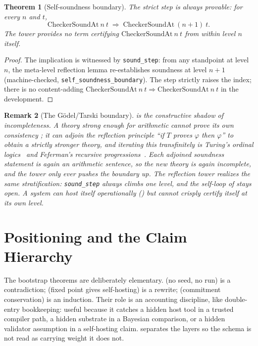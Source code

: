 \documentclass[11pt,a4paper]{article}
\newtheorem{theorem}{Theorem}[section]
\newtheorem{remark}[theorem]{Remark}
\begin{document}
\begin{theorem}[Self-soundness boundary]
\label{thm:self-boundary}
The strict step is always provable: for every $n$ and $t$,
\[
  \mathrm{CheckerSoundAt}\ n\ t \;\Rightarrow\;
  \mathrm{CheckerSoundAt}\ (n+1)\ t.
\]
The tower provides no term certifying $\mathrm{CheckerSoundAt}\ n\ t$ from
within level $n$ itself.
\end{theorem}

\begin{proof}
The implication is witnessed by \texttt{sound\_step}: from any standpoint at
level $n$, the meta-level reflection lemma re-establishes soundness at level
$n+1$
(machine-checked, \texttt{self\_soundness\_boundary}).
The step strictly raises the index; there is no content-adding
$\mathrm{CheckerSoundAt}\ n\ t \Rightarrow \mathrm{CheckerSoundAt}\ n\ t$ in
the development.
\end{proof}

\begin{remark}[The G\"odel/Tarski boundary]
\label{rem:godel}
 is the constructive shadow of incompleteness.
A theory strong enough for arithmetic cannot prove its own consistency
\cite{godel1931}; it can adjoin the reflection principle ``if $T$ proves
$\varphi$ then $\varphi$'' to obtain a strictly stronger theory, and iterating
this transfinitely is Turing's ordinal logics~\cite{turing1939} and Feferman's
recursive progressions~\cite{feferman1962}.
Each adjoined soundness statement is again an arithmetic sentence, so the new
theory is again incomplete, and the tower only ever pushes the boundary up.
The reflection tower realizes the same stratification: \texttt{sound\_step}
always climbs one level, and the self-loop of  stays open.
A system can host itself operationally () but cannot
crisply certify itself at its own level.
\end{remark}

\section{Positioning and the Claim Hierarchy}
\label{sec:positioning}

The bootstrap theorems are deliberately elementary.
 (no seed, no run) is a contradiction;
 (fixed point gives self-hosting) is a rewrite;
 (commitment conservation) is an induction.
Their role is an accounting discipline, like double-entry bookkeeping:
useful because it catches a hidden host tool in a trusted compiler path, a
hidden substrate in a Bayesian comparison, or a hidden validator assumption in
a self-hosting claim.
 separates the layers so the schema is not read as
carrying weight it does not.
\end{document}
